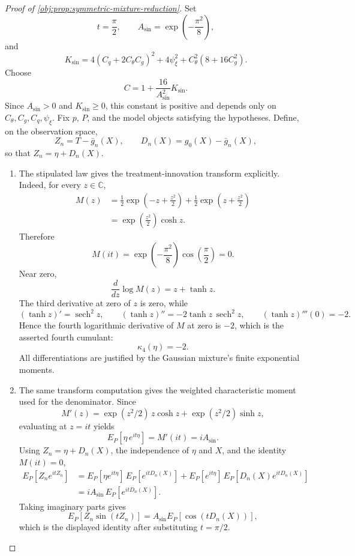 \begin{proof}[Proof of \cref{obj:prop:symmetric-mixture-reduction}]
Set
\[
t=\frac{\pi}{2},\qquad
A_{\sin}=\exp\!\left(-\frac{\pi^2}{8}\right),
\]
and
\[
K_{\sin}
=
4(C_q+2C_{\theta}C_g)^2+4\psi_{\xi}^2
+C_{\theta}^2(8+16C_g^2).
\]
Choose
\[
C=1+\frac{16}{A_{\sin}^2}K_{\sin}.
\]
Since \(A_{\sin}>0\) and \(K_{\sin}\ge0\), this constant is positive and depends only on
\(C_{\theta},C_g,C_q,\psi_{\xi}\). Fix \(p\), \(P\), and the model objects satisfying the
hypotheses. Define, on the observation space,
\[
Z_n=T-\bar g_n(X),\qquad
D_n(X)=g_0(X)-\bar g_n(X),
\]
so that \(Z_n=\eta+D_n(X)\). %

\begin{enumerate}
\item The stipulated law gives the treatment-innovation transform explicitly. Indeed, for
every \(z\in\mathbb C\),
\[
\begin{aligned}
M(z)
&=\frac12\exp\!\left(-z+\frac{z^2}{2}\right)
  +\frac12\exp\!\left(z+\frac{z^2}{2}\right)  \\
&=\exp\!\left(\frac{z^2}{2}\right)\cosh z .
\end{aligned}
\]
Therefore
\[
M(it)=\exp\!\left(-\frac{\pi^2}{8}\right)\cos\!\left(\frac{\pi}{2}\right)=0.
\]
Near zero,
\[
\frac{d}{dz}\log M(z)=z+\tanh z.
\]
The third derivative at zero of \(z\) is zero, while
\[
(\tanh z)'=\operatorname{sech}^2 z,\qquad
(\tanh z)''=-2\tanh z\,\operatorname{sech}^2 z,
\qquad
(\tanh z)'''(0)=-2.
\]
Hence the fourth logarithmic derivative of \(M\) at zero is \(-2\), which is the asserted
fourth cumulant:
\[
\kappa_4(\eta)=-2 .
\]
All differentiations are justified by the Gaussian mixture's finite exponential moments. %

\item The same transform computation gives the weighted characteristic moment used for the
denominator. Since
\[
M'(z)=\exp(z^2/2)\,z\cosh z+\exp(z^2/2)\sinh z,
\]
evaluating at \(z=it\) yields
\[
E_P\!\left[\eta\,e^{it\eta}\right]
=M'(it)
=iA_{\sin}.
\]
Using \(Z_n=\eta+D_n(X)\), the independence of \(\eta\) and \(X\), and the identity
\(M(it)=0\),
\[
\begin{aligned}
E_P[Z_ne^{itZ_n}]
&=E_P[\eta e^{it\eta}]\,E_P[e^{itD_n(X)}]
  +E_P[e^{it\eta}]\,E_P[D_n(X)e^{itD_n(X)}] \\
&=iA_{\sin}\,E_P[e^{itD_n(X)}].
\end{aligned}
\]
Taking imaginary parts gives
\[
E_P\!\left[Z_n\sin(tZ_n)\right]
=
A_{\sin}E_P\!\left[\cos(tD_n(X))\right],
\]
which is the displayed identity after substituting \(t=\pi/2\). %


\end{enumerate}
\end{proof}
